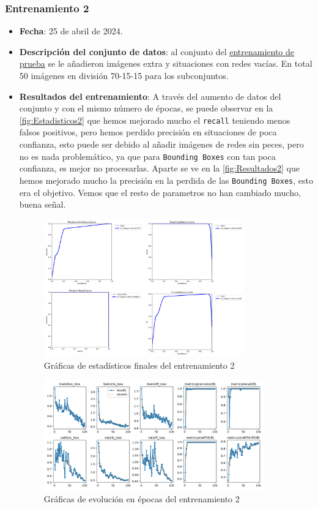 \subsubsection*{Entrenamiento 2}
\label{train:2}
\begin{itemize}
    \item \textbf{Fecha}: 25 de abril de 2024.
    \item \textbf{Descripción del conjunto de datos}: al conjunto del \hyperref[train:1]{entrenamiento de prueba} se le añadieron imágenes extra y situaciones con redes vacías. En total 50 imágenes en división 70-15-15 para los subconjuntos.
    \item \textbf{Resultados del entrenamiento}: A través del aumento de datos del conjunto y con el mismo número de épocas, se puede observar en la \autoref{fig:Estadisticos2} que hemos mejorado mucho el \texttt{recall} teniendo menos falsos positivos, 
    pero hemos perdido precisión en situaciones de poca confianza, esto puede ser debido al añadir imágenes de redes sin peces, pero no es nada problemático, ya que para \texttt{Bounding Boxes} con tan poca confianza, es mejor no procesarlas. 
    Aparte se ve en la \autoref{fig:Resultados2} que hemos mejorado mucho la precisión en la perdida de las \texttt{Bounding Boxes}, esto era el objetivo. Vemos que el resto de parametros no han cambiado mucho, buena señal.
    \begin{figure}[H]
        \centering
        \includegraphics[width=0.82\textwidth]{images/13/b/2/graficas2.png}
        \caption{Gráficas de estadísticos finales del entrenamiento 2}
        \label{fig:Estadisticos2}
    \end{figure}
    \begin{figure}[H]
        \centering
        \includegraphics[width=0.9\textwidth]{images/13/b/2/results.png}
        \caption{Gráficas de evolución en épocas del entrenamiento 2}
        \label{fig:Resultados2}
    \end{figure}
\end{itemize}
